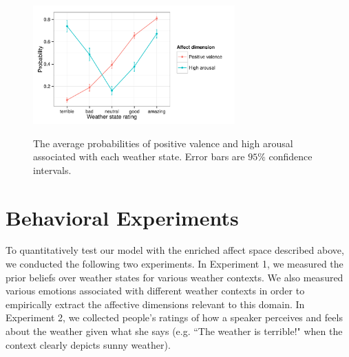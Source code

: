 \documentclass[10pt,letterpaper]{article}
\begin{document}


\begin{figure}
\includegraphics[width=220pt, height=150pt]{affect-prior.pdf}
\caption{The average probabilities of positive valence and high arousal associated with each weather state. Error bars are $95\%$ confidence intervals.}
\label{affect-prior}
\end{figure}

\section{Behavioral Experiments}
To quantitatively test our model with the enriched affect space described above, we conducted the following two experiments. In Experiment 1, we measured the prior beliefs over weather states for various weather contexts. We also measured various emotions associated with different weather contexts in order to empirically extract the affective dimensions relevant to this domain. In Experiment 2, we collected people's ratings of how a speaker perceives and feels about the weather given what she says (e.g. ``The weather is terrible!" when the context clearly depicts sunny weather).
\end{document}

